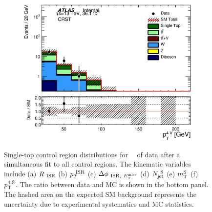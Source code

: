 \begin{figure}[h!]
\begin{center}
\begin{subfigure}[b]{0.40\textwidth}
    	 \includegraphics[width=\textwidth]{figures/plotRegion/CA_pTjV4_CRST_log.eps}
               \caption{ }
    \end{subfigure}
     \caption[Single-top control region distributions for \intlumi\ \ifb\ of data after a simultaneous fit to all control regions.]{ Single-top control region distributions for \intlumi\ \ifb\ of data after a simultaneous fit to all control regions. The kinematic variables include (a) $R_{~\mathrm{ISR}}$ (b) $p_{T}^{~\mathrm{ISR}}$ (c) $\Delta\phi_{~\mathrm{ISR},~E_{\mathrm{T}}^{\mathrm{miss}}}$ (d) $N_{\mathrm{jet}}^{~\mathrm{S}}$ (e) $m_{\mathrm{T}}^{\mathrm{S}}$ (f) $p_{\mathrm{T}}^{4,\mathrm{S}}$.  The ratio between data and MC is shown in the bottom panel. The hashed area on the expected SM background represents the uncertainty due to experimental systematics and MC statistics.
     }
  \label{fig:CRST1}
    \end{center}
\end{figure}

\pagebreak



